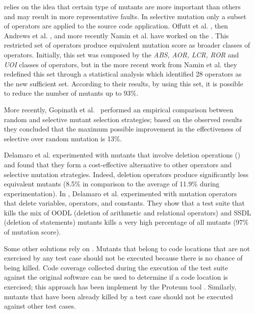  relies on the idea that certain type of mutants are more important than others and may result in more representative faults. In selective mutation only a subset of operators are applied to the source code application.
Offutt et al. \cite{offutt1996experimental}, then Andrews et al. \cite{andrews2005mutation}, and more recently Namin et al. \cite{siami2008sufficient} have worked on the . This restricted set of operators produce equivalent mutation score as broader classes of operators. Initially, this set was composed by the \textit{ABS, AOR, LCR, ROR} and \textit{UOI} classes of operators, but in the more recent work from Namin et al. \cite{siami2008sufficient} they redefined this set through a statistical analysis which identified 28 operators as the new sufficient set. According to their results, by using this set, it is possible to reduce the number of mutants up to 93\%. 

More recently, Gopinath et al.~\cite{gopinath2016limits} performed an empirical comparison between random and selective mutant selection strategies; based on the observed results they concluded that the maximum possible improvement in the effectiveness of selective over random mutation is 13\%.

Delamaro et al. \cite{delamaro2014designing,delamaro2014experimental} experimented with mutants that involve deletion operations () and found that they form a cost-effective alternative to other operators and selective mutation strategies. Indeed, deletion operators produce significantly less equivalent mutants (8.5\% in comparison to the average of 11.9\% during experimentation). 
In \cite{delamaro2014experimental}, Delamaro et al. experimented with mutation operators that delete variables, operators, and constants. They show that a test suite that kills the mix of OODL (deletion of arithmetic and relational operators) and SSDL (deletion of statements) mutants kills a very high percentage of all mutants (97\% of mutation score).

Some other solutions rely on . Mutants that belong to code locations that are not exercised by any test case should not be executed because there is no chance of being killed. Code coverage collected during the execution of the test suite against the original software can be used to determine if a code location is exercised; this approach has been implement by the Proteum tool \cite{delamaro1996proteum}.
Similarly, mutants that have been already killed by a test case should not be executed against other test cases.

